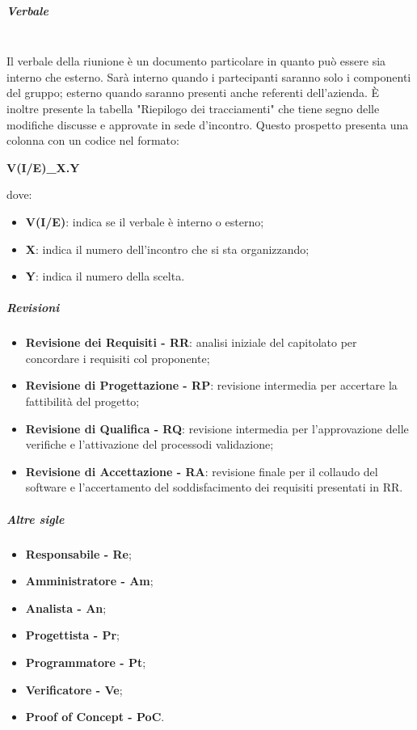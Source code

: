                 \subparagraph{Verbale}\mbox{}\\ [1mm]
                    Il verbale della riunione è un documento particolare in quanto può essere sia interno che esterno. Sarà interno quando
                    i partecipanti saranno solo i componenti del gruppo; esterno quando saranno presenti anche referenti dell'azienda.
                    È inoltre presente la tabella "Riepilogo dei tracciamenti" che tiene segno delle modifiche discusse e
                    approvate in sede d'incontro. Questo prospetto presenta una colonna con un codice nel formato: \newline \newline
                    \centerline{\textbf{V(I/E)\_X.Y}} \newline \newline
                    dove:
                    \begin{itemize}
                        \item \textbf{V(I/E)}: indica se il verbale è interno o esterno;
                        \item \textbf{X}: indica il numero dell'incontro che si sta organizzando;
                        \item \textbf{Y}: indica il numero della scelta.
                    \end{itemize}
                \subparagraph{Revisioni}
                \begin{itemize}
                    \item \textbf{Revisione dei Requisiti - RR}: analisi iniziale del capitolato per concordare i requisiti col proponente;
                    \item \textbf{Revisione di Progettazione - RP}: revisione intermedia per accertare la fattibilità del progetto\glo;
                    \item \textbf{Revisione di Qualifica - RQ}: revisione intermedia per l'approvazione delle verifiche e l'attivazione del processo\glosp di validazione\glo;
                    \item \textbf{Revisione di Accettazione - RA}: revisione finale per il collaudo del software e l'accertamento del soddisfacimento dei requisiti presentati in RR.
                \end{itemize}
                \subparagraph{Altre sigle}
                    \begin{itemize}
                        \item \textbf{Responsabile - Re};
                        \item \textbf{Amministratore - Am};
                        \item \textbf{Analista - An};
                        \item \textbf{Progettista - Pr};
                        \item \textbf{Programmatore - Pt};
                        \item \textbf{Verificatore - Ve};
                        \item \textbf{Proof of Concept - PoC}\glo.
                    \end{itemize}
